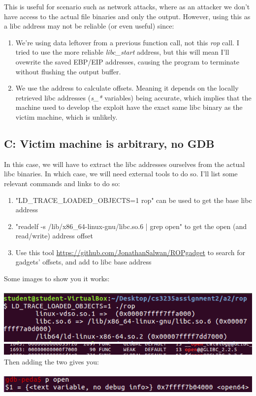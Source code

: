 \documentclass[12pt]{article}
\begin{document}
This is useful for scenario such as network attacks, where as an attacker we don't have access to the actual file binaries and only the output.
However, using this as a libc address may not be reliable (or even useful) since:
\begin{enumerate}
    \item We're using data leftover from a previous function call, not this \emph{rop} call. I tried to use the more reliable \emph{libc\_start} address, but this will mean I'll ovewrite the saved EBP/EIP addresses, causing the program to terminate without flushing the output buffer.
    \item We use the address to calculate offsets. Meaning it depends on the locally retrieved libc addresses (\emph{s\_*} variables) being accurate, which implies that the machine used to develop the exploit have the exact same libc binary as the victim machine, which is unlikely.
\end{enumerate}

\subsection*{C: Victim machine is arbitrary, no GDB}
In this case, we will have to extract the libc addresses ourselves from the actual libc binaries.
In which case, we will need external tools to do so.
I'll list some relevant commands and links to do so:
\begin{enumerate}
    \item "LD\_TRACE\_LOADED\_OBJECTS=1 rop" can be used to get the base libc address
    \item "readelf -s /lib/x86\_64-linux-gnu/libc.so.6 | grep open" to get the open (and read/write) address offset
    \item Use this tool \url{https://github.com/JonathanSalwan/ROPgadget} to search for gadgets' offsets, and add to libc base address
\end{enumerate}
Some images to show you it works:\\\\
\includegraphics[scale=1]{./a2/rop/libcaddr.PNG}\\
\includegraphics[scale=1]{./a2/rop/openoffset.PNG}\\
Then adding the two gives you:\\\\
\includegraphics[scale=1]{./a2/rop/openaddr.PNG}
\end{document}
